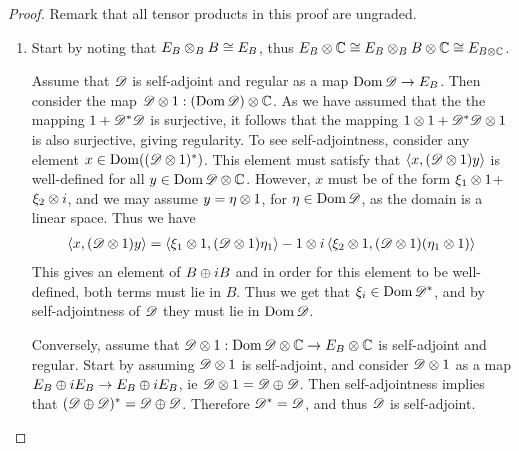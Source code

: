 \begin{proof}
	Remark that all tensor products in this proof are ungraded. 
	\begin{enumerate}
	\item
		Start by noting that $E_B\otimes_B B \cong E_B$, thus $E_B \otimes \mathbb{C} \cong E_B \otimes_B B \otimes \mathbb{C} \cong E_{B\otimes \mathbb{C}}$.  
	
		Assume that $\mathscr{D}$ is self-adjoint and regular as a map $\operatorname{Dom} \mathscr{D} \to E_B$. Then consider the map $\mathscr{D}\otimes 1:(\operatorname{Dom} \mathscr{D})\otimes \mathbb{C}$. As we have assumed that the the mapping $1+\mathscr{D}^*\mathscr{D}$ is surjective, it follows that the mapping $1\otimes 1+\mathscr{D}^* \mathscr{D} \otimes 1$ is also surjective, giving regularity. To see self-adjointness, consider any element $x\in \operatorname{Dom} ((\mathscr{D}\otimes 1)^*)$. This element must satisfy that $\left \langle x,(\mathscr{D} \otimes 1) y \right \rangle$ is well-defined for all $y\in \operatorname{Dom} \mathscr{D} \otimes \mathbb{C}$. However, $x$ must be of the form $\xi_1\otimes 1$+ $\xi_2\otimes i$, and we may assume $y=\eta \otimes 1$, for $\eta \in \operatorname{Dom} \mathscr{D}$, as the domain is a linear space. Thus we have 
		\begin{align*}
			\left \langle x,(\mathscr{D} \otimes 1 )y \right \rangle=\left \langle \xi_1\otimes 1,(\mathscr{D}\otimes 1) \eta_1 \right \rangle -1\otimes i\left \langle \xi_2\otimes 1,(\mathscr{D}\otimes 1)(\eta_1\otimes 1) \right \rangle 
		\end{align*}
		This gives an element of $B\oplus iB$ and in order for this element to be well-defined, both terms must lie in $B$. Thus we get that $\xi_i\in \operatorname{Dom} \mathscr{D}^*$, and by self-adjointness of $\mathscr{D}$ they must lie in $\operatorname{Dom} \mathscr{D}$. 
		
		Conversely, assume that $\mathscr{D}\otimes 1:\operatorname{Dom} \mathscr{D} \otimes \mathbb{C} \to E_B\otimes \mathbb{C}$ is self-adjoint and regular. Start by assuming $\mathscr{D}\otimes 1$ is self-adjoint, and consider $\mathscr{D}\otimes 1$ as a map $E_B\oplus iE_B \to E_B\oplus iE_B$, ie $\mathscr{D}\otimes 1=\mathscr{D}\oplus \mathscr{D}$. Then self-adjointness implies that $(\mathscr{D} \oplus \mathscr{D})^*=\mathscr{D} \oplus \mathscr{D}$. Therefore $\mathscr{D}^*=\mathscr{D}$, and thus $\mathscr{D}$ is self-adjoint. 
		

\end{enumerate}
\end{proof}
